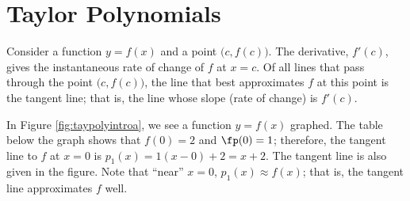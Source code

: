 \section{Taylor Polynomials}\label{sec:taylorpolynomials}

Consider a function $y=f(x)$ and a point $\big(c,f(c)\big)$. The derivative, $f'(c)$, gives the instantaneous rate of change of $f$ at $x=c$. Of all lines that pass through the point $\big(c,f(c)\big)$, the line that best approximates $f$ at this point is the tangent line; that is, the line whose slope (rate of change) is $f'(c)$.

In Figure \ref{fig:taypolyintroa}, we see a function $y=f(x)$ graphed. The table below the graph shows that $f(0)=2$ and $\fp(0) = 1$; therefore, the tangent line to $f$ at $x=0$ is $p_1(x) = 1(x-0)+2 = x+2$. The tangent line is also given in the figure. Note that ``near'' $x=0$, $p_1(x) \approx f(x)$; that is, the tangent line approximates $f$ well.


